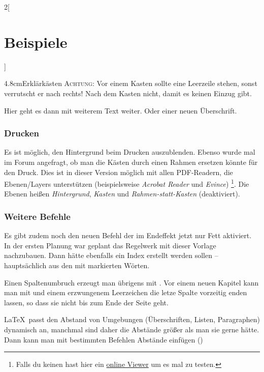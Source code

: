 \documentclass[linksbund]{rpg-ilaris}
\begin{document}
\begin{multicols}{2}[        %
		\chapter{Beispiele}  %
		]
\begin{kasten}{4.8cm}{Erklärkästen}
	\textsc{Achtung:} Vor einem Kasten sollte eine Leerzeile stehen, sonst verrutscht er nach rechts! Nach dem Kasten nicht, damit es keinen Einzug gibt.
\end{kasten}

Hier geht es dann mit weiterem Text weiter. Oder einer neuen Überschrift.

\subsection{Drucken}
Es ist möglich, den Hintergrund beim Drucken auszublenden.
Ebenso wurde mal im Forum angefragt, ob man die Kästen durch einen Rahmen ersetzen könnte für den Druck.
Dies ist in dieser Version möglich mit allen PDF-Readern, die Ebenen/Layers unterstützen (beispielsweise \emph{Acrobat Reader} und \emph{Evince})
\footnote{Falls du keinen hast hier ein \href{https://www.pdftron.com/webviewer/demo}{online Viewer} um es mal zu testen.}.
Die Ebenen heißen \emph{Hintergrund}, \emph{Kasten} und \emph{Rahmen-statt-Kasten} (deaktiviert).


\clearpage %

 
\subsection{Weitere Befehle}

Es gibt zudem noch den neuen Befehl  der im Endeffekt jetzt nur Fett aktiviert. In der ersten Planung war geplant das Regelwerk mit dieser Vorlage nachzubauen. Dann hätte ebenfalls ein Index erstellt werden sollen – hauptsächlich aus den mit  markierten Wörten.

Einen Spaltenumbruch erzeugt man übrigens mit . Vor einem neuen Kapitel kann man mit  und einem erzwungenem Leerzeichen die letze Spalte vorzeitig enden lassen, so dass sie nicht bis zum Ende der Seite geht. 

\LaTeX\ passt den Abstand von Umgebungen (Überschriften, Listen, Paragraphen) dynamisch an, manchmal sind daher die Abstände größer als man sie gerne hätte. Dann kann man mit bestimmten Befehlen Abstände einfügen ()


\end{multicols}
\end{document}
